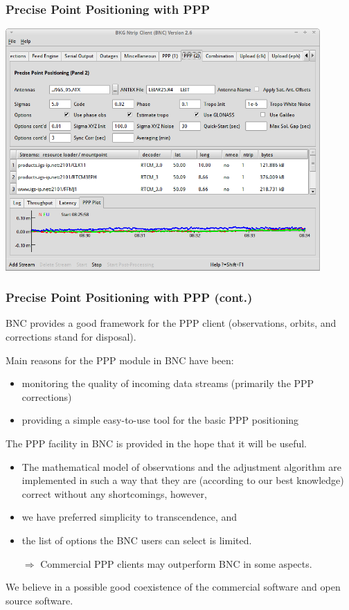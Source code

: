 \documentclass[10pt]{beamer}
\begin{document}

\begin{frame}
  \frametitle{Precise Point Positioning with PPP}
  \begin{center}
    \includegraphics[width=0.9\textwidth,angle=0]{ppp1.png}
  \end{center}
\end {frame}


\begin{frame}
  \frametitle{Precise Point Positioning with PPP (cont.)}
  BNC provides a good framework for the PPP client (observations, orbits, and
  corrections stand for disposal). 

  Main reasons for the PPP module in BNC have been:
  \begin{itemize}
  \item monitoring the quality of incoming data streams (primarily the PPP
    corrections) 
  \item providing a simple easy-to-use tool for the basic PPP positioning 
  \end{itemize}

  The PPP facility in BNC is provided in the hope that it will be useful.
  \begin{itemize}
  \item The mathematical model of observations and the adjustment algorithm are
    implemented in such a way that they are (according to our best knowledge)
    correct without any shortcomings, however,
  \item we have preferred simplicity to transcendence, and
  \item the list of options the BNC users can select is limited.
  \item[$\Rightarrow$] Commercial PPP clients may outperform BNC in some
    aspects.
  \end{itemize}
  We believe in a possible good coexistence of the commercial software and
  open source software.
\end {frame}
\end{document}
